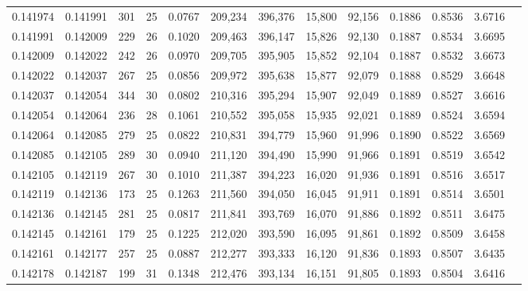 \begin{tabular}{rrrrrrrrrrrrr}
0.141974 & 0.141991 & 301 &  25 &                                     0.0767 & 209,234 & 396,376 &  15,800 &  92,156 & 0.1886 & 0.8536 & 3.6716 \\
0.141991 & 0.142009 & 229 &  26 &                                     0.1020 & 209,463 & 396,147 &  15,826 &  92,130 & 0.1887 & 0.8534 & 3.6695 \\
0.142009 & 0.142022 & 242 &  26 &                                     0.0970 & 209,705 & 395,905 &  15,852 &  92,104 & 0.1887 & 0.8532 & 3.6673 \\
0.142022 & 0.142037 & 267 &  25 &                                     0.0856 & 209,972 & 395,638 &  15,877 &  92,079 & 0.1888 & 0.8529 & 3.6648 \\
0.142037 & 0.142054 & 344 &  30 &                                     0.0802 & 210,316 & 395,294 &  15,907 &  92,049 & 0.1889 & 0.8527 & 3.6616 \\
0.142054 & 0.142064 & 236 &  28 &                                     0.1061 & 210,552 & 395,058 &  15,935 &  92,021 & 0.1889 & 0.8524 & 3.6594 \\
0.142064 & 0.142085 & 279 &  25 &                                     0.0822 & 210,831 & 394,779 &  15,960 &  91,996 & 0.1890 & 0.8522 & 3.6569 \\
0.142085 & 0.142105 & 289 &  30 &                                     0.0940 & 211,120 & 394,490 &  15,990 &  91,966 & 0.1891 & 0.8519 & 3.6542 \\
0.142105 & 0.142119 & 267 &  30 &                                     0.1010 & 211,387 & 394,223 &  16,020 &  91,936 & 0.1891 & 0.8516 & 3.6517 \\
0.142119 & 0.142136 & 173 &  25 &                                     0.1263 & 211,560 & 394,050 &  16,045 &  91,911 & 0.1891 & 0.8514 & 3.6501 \\
0.142136 & 0.142145 & 281 &  25 &                                     0.0817 & 211,841 & 393,769 &  16,070 &  91,886 & 0.1892 & 0.8511 & 3.6475 \\
0.142145 & 0.142161 & 179 &  25 &                                     0.1225 & 212,020 & 393,590 &  16,095 &  91,861 & 0.1892 & 0.8509 & 3.6458 \\
0.142161 & 0.142177 & 257 &  25 &                                     0.0887 & 212,277 & 393,333 &  16,120 &  91,836 & 0.1893 & 0.8507 & 3.6435 \\
0.142178 & 0.142187 & 199 &  31 &                                     0.1348 & 212,476 & 393,134 &  16,151 &  91,805 & 0.1893 & 0.8504 & 3.6416 \\

\end{tabular}
